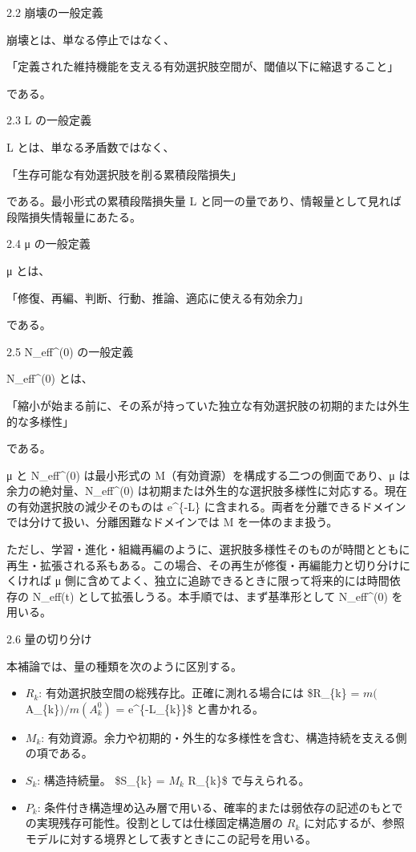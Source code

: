 \documentclass[12pt,a4paper]{article}
\begin{document}
2.2 崩壊の一般定義

崩壊とは、単なる停止ではなく、

「定義された維持機能を支える有効選択肢空間が、閾値以下に縮退すること」

である。

2.3 L の一般定義

L とは、単なる矛盾数ではなく、

「生存可能な有効選択肢を削る累積段階損失」

である。最小形式の累積段階損失量 L と同一の量であり、情報量として見れば段階損失情報量にあたる。

2.4 μ の一般定義

μ とは、

「修復、再編、判断、行動、推論、適応に使える有効余力」

である。

2.5 N\_eff\^{}(0) の一般定義

N\_eff\^{}(0) とは、

「縮小が始まる前に、その系が持っていた独立な有効選択肢の初期的または外生的な多様性」

である。

μ と N\_eff\^{}(0) は最小形式の M（有効資源）を構成する二つの側面であり、μ は余力の絶対量、N\_eff\^{}(0) は初期または外生的な選択肢多様性に対応する。現在の有効選択肢の減少そのものは e\^{}\{-L\} に含まれる。両者を分離できるドメインでは分けて扱い、分離困難なドメインでは M を一体のまま扱う。

ただし、学習・進化・組織再編のように、選択肢多様性そのものが時間とともに再生・拡張される系もある。この場合、その再生が修復・再編能力と切り分けにくければ μ 側に含めてよく、独立に追跡できるときに限って将来的には時間依存の N\_eff(t) として拡張しうる。本手順では、まず基準形として N\_eff\^{}(0) を用いる。

2.6 量の切り分け

本補論では、量の種類を次のように区別する。

\begin{itemize}
\item
  \(R_{k}\): 有効選択肢空間の総残存比。正確に測れる場合には \$R\_\{k\} = \(m(\)A\_\{k\}\() / m(A_{k}^0)\) = e\^{}\{-L\_\{k\}\}\$ と書かれる。
\item
  \(M_{k}\): 有効資源。余力や初期的・外生的な多様性を含む、構造持続を支える側の項である。
\item
  \(S_{k}\): 構造持続量。 \$S\_\{k\} = \(M_{k}\) R\_\{k\}\$ で与えられる。
\item
  \(P_{k}\): 条件付き構造埋め込み層で用いる、確率的または弱依存の記述のもとでの実現残存可能性。役割としては仕様固定構造層の \(R_{k}\) に対応するが、参照モデルに対する境界として表すときにこの記号を用いる。
\end{itemize}
\end{document}
